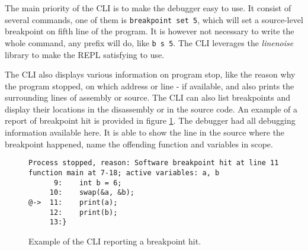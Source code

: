 The main priority of the CLI is to make the debugger easy to use. It consist of
several commands, one of them is \texttt{breakpoint set 5}, which will set a
source-level breakpoint on fifth line of the program. It is however not
necessary to write the whole command, any prefix will do, like \texttt{b s 5}.
The CLI leverages the \textit{linenoise}~\cite{linenoise} library to make the
REPL satisfying to use.

The CLI also displays various information on program stop, like the reason why
the program stopped, on which address or line - if available, and also prints
the surrounding lines of assembly or source. The CLI can also list breakpoints
and display their locations in the disassembly or in the source code. An
example of a report of breakpoint hit is provided in figure \ref{fig:cli-hit}.
The debugger had all debugging information available here. It is able to show
the line in the source where the breakpoint happened, name the offending
function and variables in scope.

\begin{figure}
    \begin{lstlisting}
Process stopped, reason: Software breakpoint hit at line 11
function main at 7-18; active variables: a, b
      9:    int b = 6;
     10:    swap(&a, &b);
@->  11:    print(a);
     12:    print(b);
     13:}
    \end{lstlisting}
    \caption{Example of the CLI reporting a breakpoint hit.}
    \label{fig:cli-hit}
\end{figure}

